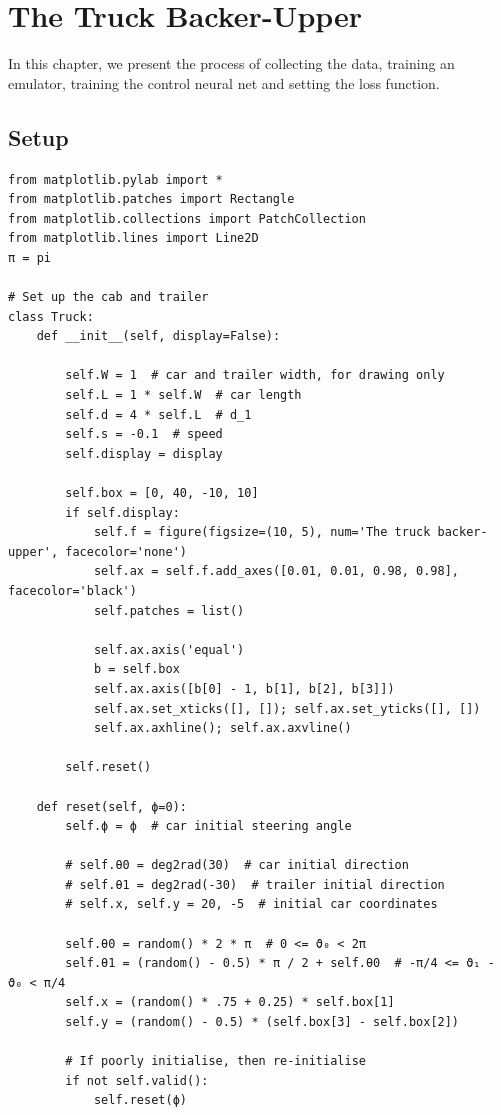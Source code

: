 \chapter{The Truck Backer-Upper}

In this chapter, we present the process of collecting the data, training an emulator, training the control neural net and setting the loss function. 
\section{Setup}
\begin{verbatim}
from matplotlib.pylab import *
from matplotlib.patches import Rectangle
from matplotlib.collections import PatchCollection
from matplotlib.lines import Line2D
π = pi

# Set up the cab and trailer
class Truck:
    def __init__(self, display=False):

        self.W = 1  # car and trailer width, for drawing only
        self.L = 1 * self.W  # car length
        self.d = 4 * self.L  # d_1
        self.s = -0.1  # speed
        self.display = display
        
        self.box = [0, 40, -10, 10]
        if self.display:
            self.f = figure(figsize=(10, 5), num='The truck backer-upper', facecolor='none')
            self.ax = self.f.add_axes([0.01, 0.01, 0.98, 0.98], facecolor='black')
            self.patches = list()
            
            self.ax.axis('equal')
            b = self.box
            self.ax.axis([b[0] - 1, b[1], b[2], b[3]])
            self.ax.set_xticks([], []); self.ax.set_yticks([], [])
            self.ax.axhline(); self.ax.axvline()

        self.reset()
    
    def reset(self, ϕ=0):
        self.ϕ = ϕ  # car initial steering angle
        
        # self.θ0 = deg2rad(30)  # car initial direction
        # self.θ1 = deg2rad(-30)  # trailer initial direction
        # self.x, self.y = 20, -5  # initial car coordinates
        
        self.θ0 = random() * 2 * π  # 0 <= ϑ₀ < 2π
        self.θ1 = (random() - 0.5) * π / 2 + self.θ0  # -π/4 <= ϑ₁ - ϑ₀ < π/4
        self.x = (random() * .75 + 0.25) * self.box[1]
        self.y = (random() - 0.5) * (self.box[3] - self.box[2])
        
        # If poorly initialise, then re-initialise
        if not self.valid():
            self.reset(ϕ)
        

\end{verbatim}
